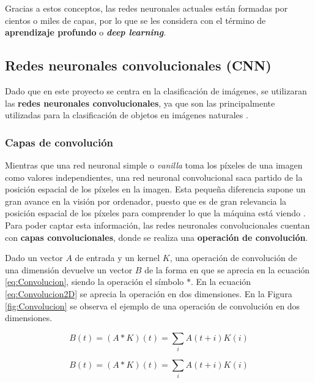 \documentclass{report}
\begin{document}
Gracias a estos conceptos, las redes neuronales actuales están formadas por cientos o miles de capas, por lo que se les considera con el término de \textbf{aprendizaje profundo} o \textit{\textbf{deep learning}}.



\subsection{ Redes neuronales convolucionales (CNN) }\label{RedesNeuronalesCNN}


Dado que en este proyecto se centra en la clasificación de imágenes, se utilizaran las \textbf{redes neuronales convolucionales}, ya que son las principalmente utilizadas para la clasificación de objetos en imágenes naturales \cite{EzequielCNN}.


\subsubsection{Capas de convolución}


Mientras que una red neuronal simple o \textit{vanilla} toma los píxeles de una imagen como valores independientes, una red neuronal convolucional saca partido de la posición espacial de los píxeles en la imagen. Esta pequeña diferencia supone un gran avance en la visión por ordenador, puesto que es de gran relevancia la posición espacial de los píxeles para comprender lo que la máquina está viendo \cite{VideoCSVCNN}. Para poder captar esta información, las redes neuronales convolucionales cuentan con \textbf{capas convolucionales}, donde se realiza una \textbf{operación de convolución}. 

Dado un vector $A$ de entrada y un kernel $K$, una operación de convolución de una dimensión devuelve un vector $B$ de la forma en que se aprecia en la ecuación \ref{eq:Convolucion}, siendo la operación el símbolo $*$. En la ecuación \ref{eq:Convolucion2D} se aprecia la operación en  dos dimensiones. En la Figura \ref{fig:Convolucion} se observa el ejemplo de una operación de convolución en dos dimensiones.



\begin{equation}
    B (t) = (A*K)(t) = \sum_{i} A (t+i) K(i)
    \label{eq:Convolucion}
\end{equation}


\begin{equation}
    B (t) = (A*K)(t) = \sum_{i} A (t+i) K(i)
    \label{eq:Convolucion2D}
\end{equation}
\end{document}
